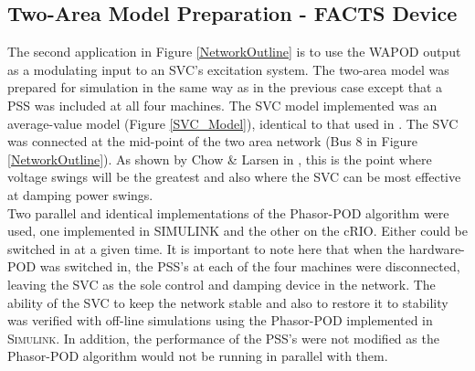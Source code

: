 \documentclass[journal]{IEEEtran}
\begin{document}




\subsection{Two-Area Model Preparation - FACTS Device}

The second application in Figure \ref{NetworkOutline} is to use the WAPOD output as a modulating input to an SVC's excitation system. The two-area model was prepared for simulation in the same way as in the previous case except that a PSS was included at all four machines. The SVC model implemented was an average-value model (Figure \ref{SVC_Model}), identical to that used in \cite{PhasorPODImplement}. The SVC was connected at the mid-point of the two area network (Bus 8 in Figure \ref{NetworkOutline}). As shown by Chow \& Larsen in \cite{sVARdamp}, this is the point where voltage swings will be the greatest and also where the SVC can be most effective at damping power swings. \\

Two parallel and identical implementations of the Phasor-POD algorithm were used, one implemented in SIMULINK and the other on the cRIO. Either could be switched in at a given time. It is important to note here that when the hardware-POD was switched in, the PSS's at each of the four machines were disconnected, leaving the SVC as the sole control and damping device in the network. The ability of the SVC to keep the network stable and also to restore it to stability was verified with off-line simulations using the Phasor-POD implemented in \textsc{Simulink}. In addition, the performance of the PSS's were not modified as the Phasor-POD algorithm would not be running in parallel with them.

\end{document}
